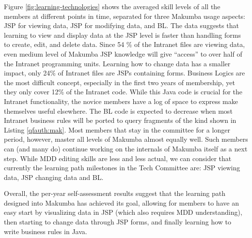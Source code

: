 \documentclass{llncs}
\begin{document}
Figure \ref{fig:learning-technologies} shows the averaged skill levels of all the members at different points in time, separated for three Makumba usage aspects: JSP for viewing data, JSP for modifying data, and BL. The data suggests that learning to view and display data at the JSP level is faster than handling forms to create, edit, and delete data. 
Since 54 \% of the Intranet files are viewing data, even medium level of Makumba JSP knowledge will give ``access'' to over half of the Intranet programming units. 
Learning how to change data has a smaller impact, only 24\% of Intranet files are JSPs containing forms. 
Business Logics are the most difficult concept, especially in the first two years of membership, yet they only cover 12\% of the Intranet code. While this Java code is crucial for the Intranet functionality, the novice members have a log of space to express make themselves useful elsewhere. The BL code is expected to decrease when most Intranet business rules will be ported to query fragments of the kind shown in Listing \ref{qfauth:mak}.
Most members that stay in the committee for a longer period, however, master all levels of Makumba almost equally well. Such members can (and many do) continue working on the internals of Makumba itself  as a next step. While MDD editing skills are less and less actual, we can consider that currently the learning path milestones in the Tech Committee are: JSP viewing data, JSP changing data and BL.

Overall, the per-year self-assessment results suggest that the learning path designed into Makumba has achieved its goal, allowing for members to have an easy start by visualizing data in JSP (which also requires MDD understanding), then starting to change data through JSP forms, and finally learning how to write business rules in Java.



\end{document}
